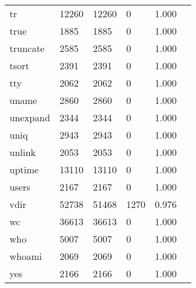 \begin{longtable}{lp{2.40cm}p{2.40cm}p{2.40cm}p{2.40cm}p{2.40cm}}
tr        &                    12260 &        12260 &             0 &                    1.000 \\
true      &                     1885 &         1885 &             0 &                    1.000 \\
truncate  &                     2585 &         2585 &             0 &                    1.000 \\
tsort     &                     2391 &         2391 &             0 &                    1.000 \\
tty       &                     2062 &         2062 &             0 &                    1.000 \\
uname     &                     2860 &         2860 &             0 &                    1.000 \\
unexpand  &                     2344 &         2344 &             0 &                    1.000 \\
uniq      &                     2943 &         2943 &             0 &                    1.000 \\
unlink    &                     2053 &         2053 &             0 &                    1.000 \\
uptime    &                    13110 &        13110 &             0 &                    1.000 \\
users     &                     2167 &         2167 &             0 &                    1.000 \\
vdir      &                    52738 &        51468 &          1270 &                    0.976 \\
wc        &                    36613 &        36613 &             0 &                    1.000 \\
who       &                     5007 &         5007 &             0 &                    1.000 \\
whoami    &                     2069 &         2069 &             0 &                    1.000 \\
yes       &                     2166 &         2166 &             0 &                    1.000 \\
\end{longtable}
